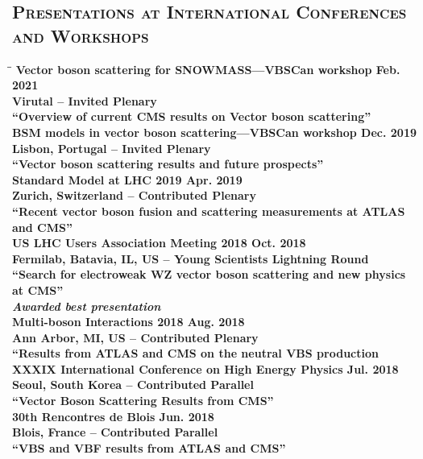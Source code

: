 \documentclass[10pt]{res} %
\begin{document}
\begin{resume}
\section{\textsc{Presentations at International Conferences and Workshops}}
\vspace{-0.1in}
\begin{tabbing}
\hspace{2.3in}\= \hspace{2.6in}\= \kill %
\bf{Vector boson scattering for SNOWMASS---VBSCan workshop} 		 \> \>	    Feb. 2021 \\
Virutal -- Invited Plenary\\
``Overview of current CMS results on Vector boson scattering'' \\
\bf{BSM models in vector boson scattering---VBSCan workshop} 		 \> \>	    Dec. 2019 \\
Lisbon, Portugal -- Invited Plenary\\
``Vector boson scattering results and future prospects'' \\
\bf{Standard Model at LHC 2019} 		 \> \>	    Apr. 2019 \\
Zurich, Switzerland -- Contributed Plenary \\
``Recent vector boson fusion and scattering measurements at ATLAS and CMS'' \\
\bf{US LHC Users Association Meeting 2018} 		 \> \>	    Oct. 2018 \\
Fermilab, Batavia, IL, US -- Young Scientists Lightning Round \\
``Search for electroweak WZ vector boson scattering and new physics at CMS'' \\
\emph{Awarded best presentation } \\
\bf{Multi-boson Interactions 2018} 		 \> \>	    Aug. 2018 \\
Ann Arbor, MI, US -- Contributed Plenary \\
``Results from ATLAS and CMS on the neutral VBS production \\
\bf{XXXIX International Conference on High Energy Physics} 		 \> \>	    Jul. 2018 \\
Seoul, South Korea -- Contributed Parallel\\
``Vector Boson Scattering Results from CMS'' \\
\bf{30th Rencontres de Blois} 		 \> \>	    Jun. 2018 \\
Blois, France -- Contributed Parallel\\
``VBS and VBF results from ATLAS and CMS'' \\

\end{tabbing}
\end{resume}
\end{document}
